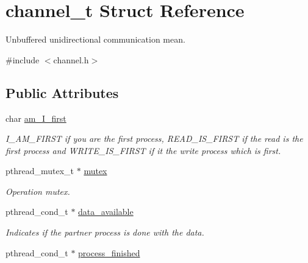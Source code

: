 \hypertarget{structchannel__t}{\section{channel\-\_\-t Struct Reference}
\label{structchannel__t}
}


Unbuffered unidirectional communication mean.  




{\ttfamily \#include $<$channel.\-h$>$}

\subsection*{Public Attributes}
\begin{DoxyCompactItemize}
\item 
\hypertarget{structchannel__t_acb326b036437bd885a9e966b46438428}{char \hyperlink{structchannel__t_acb326b036437bd885a9e966b46438428}{am\-\_\-\-I\-\_\-first}}\label{structchannel__t_acb326b036437bd885a9e966b46438428}

\begin{DoxyCompactList}\small\item\em I\-\_\-\-A\-M\-\_\-\-F\-I\-R\-S\-T if you are the first process, R\-E\-A\-D\-\_\-\-I\-S\-\_\-\-F\-I\-R\-S\-T if the read is the first process and W\-R\-I\-T\-E\-\_\-\-I\-S\-\_\-\-F\-I\-R\-S\-T if it the write process which is first. \end{DoxyCompactList}\item 
\hypertarget{structchannel__t_af5fb25d8c1f0ec6bc2f96d62deff8637}{pthread\-\_\-mutex\-\_\-t $\ast$ \hyperlink{structchannel__t_af5fb25d8c1f0ec6bc2f96d62deff8637}{mutex}}\label{structchannel__t_af5fb25d8c1f0ec6bc2f96d62deff8637}

\begin{DoxyCompactList}\small\item\em Operation mutex. \end{DoxyCompactList}\item 
\hypertarget{structchannel__t_a58027f2090783f2de6c65745358ff616}{pthread\-\_\-cond\-\_\-t $\ast$ \hyperlink{structchannel__t_a58027f2090783f2de6c65745358ff616}{data\-\_\-available}}\label{structchannel__t_a58027f2090783f2de6c65745358ff616}

\begin{DoxyCompactList}\small\item\em Indicates if the partner process is done with the data. \end{DoxyCompactList}\item 
\hypertarget{structchannel__t_ac6aab74984cd67d665c019103ad7268d}{pthread\-\_\-cond\-\_\-t $\ast$ \hyperlink{structchannel__t_ac6aab74984cd67d665c019103ad7268d}{process\-\_\-finished}}\label{structchannel__t_ac6aab74984cd67d665c019103ad7268d}


\end{DoxyCompactItemize}
